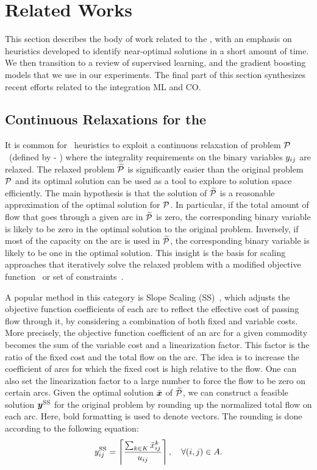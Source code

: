 \documentclass[3p, authoryear, times, doubleblind]{elsarticle}
\begin{document}
{\section{Related Works} \label{sec:related_works}

This section describes the body of work related to the \fcn, with an emphasis on heuristics developed to identify near-optimal solutions in a short amount of time.  We then transition to a review of supervised learning, and the gradient boosting models that we use in our experiments. The final part of this section synthesizes recent efforts related to the integration ML and CO. 



\subsection{Continuous Relaxations for the \fcn} 
It is common for \fcn\ heuristics to exploit a continuous relaxation of problem $\mathcal{P}$~(defined by  - ) where the integrality requirements on the binary variables $y_{ij}$ are relaxed. The relaxed problem $\widetilde{\mathcal{P}}$ is significantly easier than the original problem $\mathcal{P}$ and its optimal solution can be used as a tool to explore to solution space efficiently. The main hypothesis is that the solution of $\widetilde{\mathcal{P}}$ is a reasonable approximation of the optimal solution for $\mathcal{P}$. In particular, if the total amount of flow that goes through a given arc in $\widetilde{\mathcal{P}}$ is zero, the corresponding binary variable is likely to be zero in the optimal solution to the original problem. Inversely, if most of the capacity on the arc is used in $\widetilde{\mathcal{P}}$, the corresponding binary variable is likely to be one in the optimal solution. This insight is the basis for scaling approaches that iteratively solve the relaxed problem with a modified objective function~\citep{crainic_slope_2004} or set of constraints~\citep{katayama_capacity_2009}. 

 A popular method in this category is Slope Scaling (SS)~\citep{crainic_slope_2004}, which  adjusts the objective function coefficients of each arc to reflect the effective cost of passing flow through it, by considering a combination of both fixed and variable costs. More precisely, the objective function coefficient of an arc for a given commodity becomes the sum of the variable cost and a linearization factor. This factor is the ratio of the fixed cost and the total flow on the arc. The idea is to increase the coefficient of arcs for which the fixed cost is high relative to the flow. One can also set the linearization factor to a large number to force the flow to be zero on certain arcs. Given the optimal solution $\tilde{\boldsymbol{x}}$ of $\widetilde{\mathcal{P}}$, we can construct a feasible solution $\boldsymbol{y}^{\text{SS}}$ for the original problem by rounding up the normalized total flow on each arc. Here, bold formatting is used to denote vectors. The rounding is done according to the following equation:
\begin{align} \label{eq:slope_scaling}
    y_{ij}^{\text{SS}} = \left\lceil \frac{\sum_{k \in K} \tilde{x}_{ij}^k}{u_{ij}} \right\rceil, \quad \forall (i,j) \in A. 
\end{align}
    
}
\end{document}
